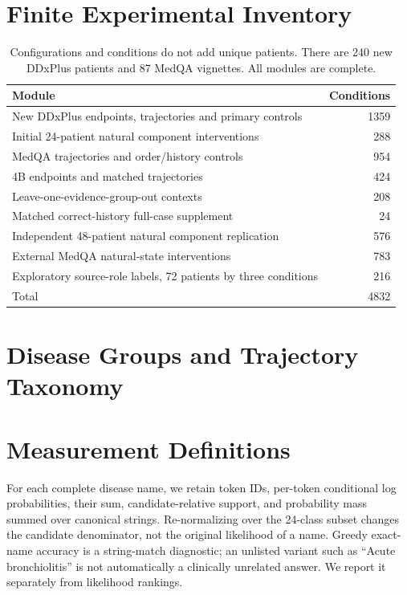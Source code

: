 \documentclass[11pt]{article}
\begin{document}
\section{Finite Experimental Inventory}\label{app:inventory}
\begin{table}[H]\centering\small
\begin{tabular}{p{}r}\toprule
Module & Conditions\\\midrule
New DDxPlus endpoints, trajectories and primary controls & 1359\\
Initial 24-patient natural component interventions & 288\\
MedQA trajectories and order/history controls & 954\\
4B endpoints and matched trajectories & 424\\
Leave-one-evidence-group-out contexts & 208\\
Matched correct-history full-case supplement & 24\\
Independent 48-patient natural component replication & 576\\
External MedQA natural-state interventions & 783\\
Exploratory source-role labels, 72 patients by three conditions & 216\\\midrule
Total & 4832\\\bottomrule
\end{tabular}
\caption{Configurations and conditions do not add unique patients. There are 240 new DDxPlus patients and 87 MedQA vignettes. All modules are complete.}
\end{table}

\section{Disease Groups and Trajectory Taxonomy}\label{app:groups}



\section{Measurement Definitions}
For each complete disease name, we retain token IDs, per-token conditional log probabilities, their sum, candidate-relative support, and probability mass summed over canonical strings. Re-normalizing over the 24-class subset changes the candidate denominator, not the original likelihood of a name. Greedy exact-name accuracy is a string-match diagnostic; an unlisted variant such as ``Acute bronchiolitis'' is not automatically a clinically unrelated answer. We report it separately from likelihood rankings.
\end{document}
